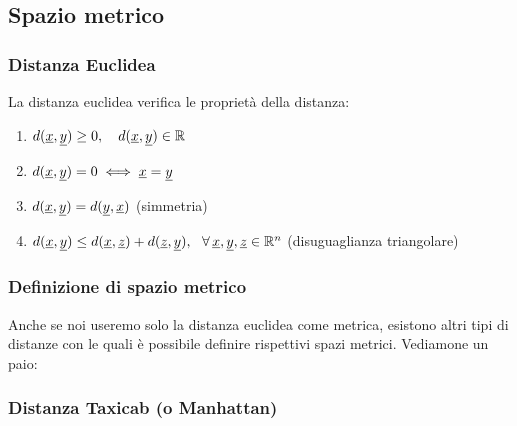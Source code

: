 \subsection{Spazio metrico}

\subsubsection{Distanza Euclidea}


La distanza euclidea verifica le proprietà della distanza:

\begin{enumerate}
    \item \(d(\underline{x},\underline{y}) \ge 0, \quad d(\underline{x},\underline{y}) \in \mathbb{R} \)
    \item \(d(\underline{x},\underline{y}) = 0 \iff \underline{x} =\underline{y} \)
    \item \(d(\underline{x},\underline{y}) = d(\underline{y},\underline{x})\) \hfill (simmetria)
    \item \(d(\underline{x},\underline{y}) \le d(\underline{x},\underline{z}) + d(\underline{z},\underline{y}),\ \ \forall \, \underline{x},\underline{y},\underline{z} \in \mathbb{R}^{n} \) \hfill (disuguaglianza triangolare)
\end{enumerate}

\subsubsection{Definizione di spazio metrico}


Anche se noi useremo solo la distanza euclidea come metrica, esistono altri tipi di distanze con le quali è possibile definire rispettivi spazi metrici. Vediamone un paio:

\subsubsection*{Distanza Taxicab (o Manhattan)}

